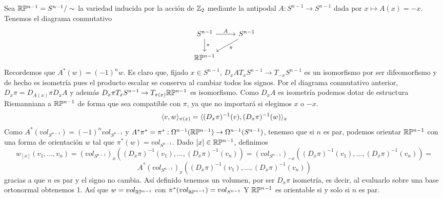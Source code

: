 \documentclass[CV.tex]{subfiles}
\begin{document}
\begin{ej}
Sea $\mathbb{R} \mathbb{P}^{n-1}=S^{n-1}/\sim$ la variedad inducida por la acción de $\mathbb{Z}_2$ mediante la antipodal $A:S^{n-1}\to S^{n-1}$ dada por $x\mapsto A(x)=-x$. Tenemos el diagrama conmutativo
\[
\begin{tikzcd}
S^{n-1}\arrow[r,"A"]\arrow[d, "\pi"] & S^{n-1}\arrow[dl, "\pi"]\\
\R\PP^{n-1} & 
\end{tikzcd}
\]
Recordemos que $A^*(w)=(-1)^nw$. Es claro que, fijado $x\in S^{n-1}$, $D_xA T_xS^{n-1}\to T_{-x}S^{n-1}$ es un isomorfismo por ser difeomorfismo y de hecho es isometría pues el producto escalar se conserva al cambiar todos los signos. Por el diagrama conmutativo anterior, $D_x\pi=D_{A(x)}\pi D_xA$ y además $D_x\pi T_xS^{n-1}\to T_{\pi(x)}\mathbb{R}\mathbb{P}^{n-1}$ es isomorfismo. Como $D_xA$ es isometría podemos dotar de estructura Riemanniana a $\mathbb{R}\mathbb{P}^{n-1}$ de forma que sea compatible con $\pi$, ya que no importará si elegimos $x$ o $-x$.
\[
\langle{v,w}\rangle_{\pi(x)}=\langle{(D_x\pi)^{-1}(v),(D_x\pi)^{-1}(w)}\rangle_x
\]
Como $A^*(vol_{S^{n-1}})=(-1)^nvol_{S^{n-1}}$ y $A^*\pi^*=\pi^*:\Omega^{n-1}(\mathbb{R}\mathbb{P}^{n-1})\to\Omega^{n-1}(S^{n-1})$, tenemso que si $n$ es par, podemos orientar $\mathbb{R}\mathbb{P}^{n-1}$ con una forma de orientación $w$ tal que $\pi^*(w)=vol_{S^{n-1}}$. Dado $[x]\in\mathbb{R}\mathbb{P}^{n-1}$, definimos
\[
w_{[x]}(v_1,\dots, v_n)=(vol_{S^{n-1}})_x((D_x\pi)^{-1}(v_1),\dots, (D_x\pi)^{-1}(v_n))=(vol_{S^{n-1}})_{-x}((D_x\pi)^{-1}(v_1),\dots, (D_x\pi)^{-1}(v_n))=
\] 
\[
A^*(vol_{S^{n-1}})_x((D_x\pi)^{-1}(v_1),\dots, (D_x\pi)^{-1}(v_n))
\]
gracias a que $n$ es par y el signo no cambia. Así definido tenemos un volumen, por ser $D_x\pi$ isometría, es decir, al evaluarlo sobre una base ortonormal obtenemos 1. Así que $w=vol_{\mathbb{R}\mathbb{P}^{n-1}}$ con $\pi^*(vol_{\mathbb{R}\mathbb{P}^{n-1}})=vol_{S^{n-1}}$ Y $\mathbb{R}\mathbb{P}^{n-1}$ es orientable si y solo si $n$ es par.
\end{ej}
\end{document}
